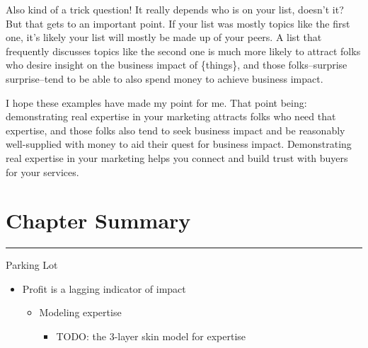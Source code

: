 Also kind of a trick question! It really depends who is on your list, doesn't it? But that gets to an important point. If your list was mostly topics like the first one, it's likely your list will mostly be made up of your peers. A list that frequently discusses topics like the second one is much more likely to attract folks who desire insight on the business impact of \{things\}, and those folks--surprise surprise--tend to be able to also spend money to achieve business impact.

I hope these examples have made my point for me. That point being: demonstrating real expertise in your marketing attracts folks who need that expertise, and those folks also tend to seek business impact and be reasonably well-supplied with money to aid their quest for business impact. Demonstrating real expertise in your marketing helps you connect and build trust with buyers for your services.

\section{Chapter Summary}

\begin{center}
\rule{3in}{0.4pt}
\end{center}

Parking Lot

\begin{itemize}
\item Profit is a lagging indicator of impact


\begin{itemize}
\item Modeling expertise


\begin{itemize}
\item TODO: the 3-layer skin model for expertise
\end{itemize}
\end{itemize}
\end{itemize}
